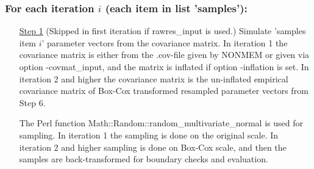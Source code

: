 \subsubsection*{For each iteration $i$ (each item in list 'samples'):}
\begin{itemize}
\item[\underline{Step 1}] (Skipped in first iteration if rawres\_input is used.)
Simulate 'samples item $i$' parameter vectors from the 
covariance matrix.
In iteration 1 the covariance matrix is either from
the .cov-file given by NONMEM or given via option -covmat\_input,
and the matrix is inflated if option -inflation is set. 
In iteration 2 and higher 
the covariance matrix is the 
un-inflated
empirical covariance matrix of Box-Cox transformed resampled parameter vectors from
Step 6.

The Perl function Math::Random::random\_multivariate\_normal
is used for sampling. 
In iteration 1 the sampling is done on the original scale. 
In iteration 2 and higher
sampling is done on Box-Cox scale, and 
then the samples are back-transformed for boundary checks and evaluation.


\end{itemize}
